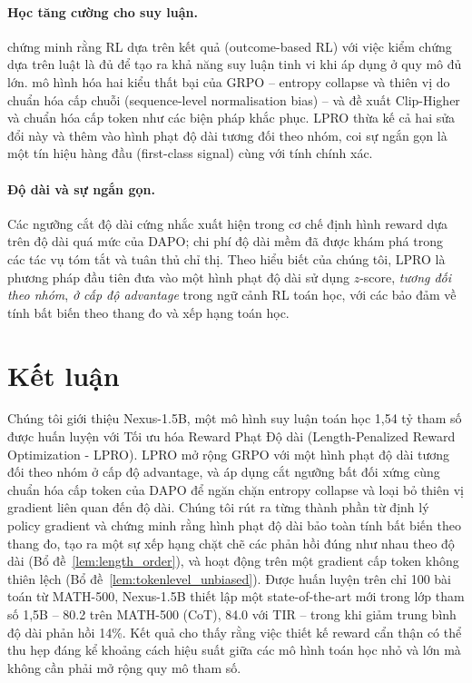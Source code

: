 \documentclass[11pt,a4paper]{article}
\begin{document}
\paragraph{Học tăng cường cho suy luận.}
\citet{deepseekai2025deepseekr1} chứng minh rằng RL dựa trên kết quả (outcome-based RL) với việc kiểm chứng
dựa trên luật là đủ để tạo ra khả năng suy luận tinh vi khi áp dụng ở
quy mô đủ lớn. \citet{yu2025dapo} mô hình hóa hai kiểu thất bại của GRPO -- entropy collapse
và thiên vị do chuẩn hóa cấp chuỗi (sequence-level normalisation bias) -- và đề xuất Clip-Higher và chuẩn hóa
cấp token như các biện pháp khắc phục. LPRO thừa kế cả hai sửa đổi này và thêm vào
hình phạt độ dài tương đối theo nhóm, coi sự ngắn gọn là một tín hiệu hàng đầu (first-class signal) cùng
với tính chính xác.

\paragraph{Độ dài và sự ngắn gọn.} Các ngưỡng cắt độ dài cứng nhắc xuất hiện trong cơ chế định hình
reward dựa trên độ dài quá mức của DAPO; chi phí độ dài mềm đã được khám phá trong các tác vụ tóm tắt và
tuân thủ chỉ thị. Theo hiểu biết của chúng tôi, LPRO là phương pháp đầu tiên đưa vào một
hình phạt độ dài sử dụng \(z\)-score, \emph{tương đối theo nhóm}, \emph{ở cấp độ advantage} trong
ngữ cảnh RL toán học, với các bảo đảm về tính bất biến theo thang đo và xếp hạng toán học.

\section{Kết luận}

Chúng tôi giới thiệu Nexus-1.5B, một mô hình suy luận toán học 1,54 tỷ tham số được huấn luyện
với Tối ưu hóa Reward Phạt Độ dài (Length-Penalized Reward Optimization - LPRO). LPRO mở rộng GRPO với một
hình phạt độ dài tương đối theo nhóm ở cấp độ advantage, và áp dụng cắt ngưỡng bất đối xứng
cùng chuẩn hóa cấp token của DAPO để ngăn chặn entropy collapse và loại bỏ thiên vị gradient
liên quan đến độ dài. Chúng tôi rút ra từng thành phần từ định lý policy gradient và
chứng minh rằng hình phạt độ dài bảo toàn tính bất biến theo thang đo, tạo ra một sự xếp hạng chặt chẽ
các phản hồi đúng như nhau theo độ dài (Bổ đề~\ref{lem:length_order}), và hoạt động
trên một gradient cấp token không thiên lệch (Bổ đề~\ref{lem:tokenlevel_unbiased}).
Được huấn luyện trên chỉ 100 bài toán từ MATH-500, Nexus-1.5B thiết lập một state-of-the-art mới
trong lớp tham số 1,5B -- 80.2 trên MATH-500 (CoT), 84.0 với TIR -- trong khi
giảm trung bình độ dài phản hồi 14\%. Kết quả cho thấy rằng việc thiết kế reward
cẩn thận có thể thu hẹp đáng kể khoảng cách hiệu suất giữa các mô hình toán học
nhỏ và lớn mà không cần phải mở rộng quy mô tham số.
\end{document}
